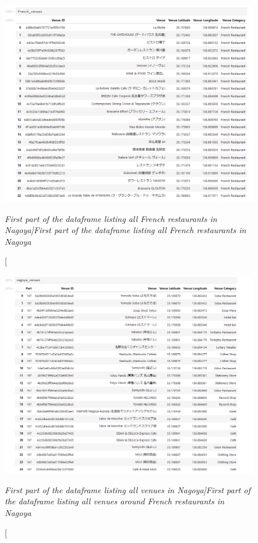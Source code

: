 \documentclass[12pt,a4paper]{article}
\begin{document}
\begin{figure}[ht]
	\begin{center}
			  \includegraphics[width=15cm]{french_venues_df.png}
	\end{center}
	\caption [\itshape First part of the dataframe listing all French restaurants in Nagoya]{\itshape First part of the dataframe listing all French restaurants in Nagoya}	
	\label{french_df}
\end{figure}

\begin{figure}[ht]
	\begin{center}
			  \includegraphics[width=15cm]{nagoya_venues_df.png}
	\end{center}
	\caption [\itshape First part of the dataframe listing all venues in Nagoya]{\itshape First part of the dataframe listing all venues around French restaurants in Nagoya}	
	\label{nagoya_df}
\end{figure}
\end{document}
